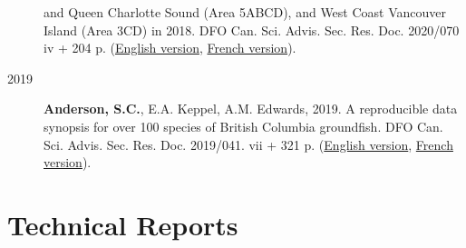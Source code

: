 \begin{description}
and Queen Charlotte Sound (Area 5ABCD), and West Coast Vancouver Island
(Area 3CD) in 2018. DFO Can. Sci. Advis. Sec. Res. Doc. 2020/070 iv +
204 p.
(\href{https://www.dfo-mpo.gc.ca/csas-sccs/Publications/ResDocs-DocRech/2020/2020_070-eng.html}{English
version},
\href{https://www.dfo-mpo.gc.ca/csas-sccs/Publications/ResDocs-DocRech/2020/2020_070-fra.html}{French
version}).
\item[2019]
\textbf{Anderson, S.C.}, E.A. Keppel, A.M. Edwards, 2019. A reproducible
data synopsis for over 100 species of British Columbia groundfish. DFO
Can. Sci. Advis. Sec. Res. Doc. 2019/041. vii + 321 p.
(\href{http://www.dfo-mpo.gc.ca/csas-sccs/Publications/ResDocs-DocRech/2019/2019_041-eng.html}{English
version},
\href{http://www.dfo-mpo.gc.ca/csas-sccs/Publications/ResDocs-DocRech/2019/2019_041-fra.html}{French
version}).
\end{description}

\section{Technical Reports}\label{technical-reports}

